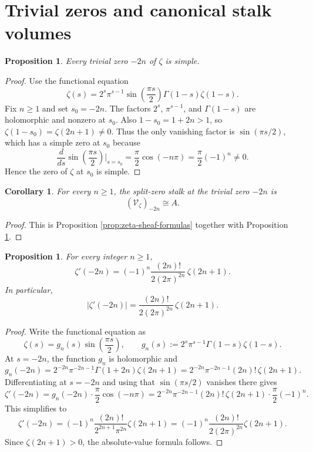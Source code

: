 \documentclass[11pt,a4paper]{article}
\newtheorem{proposition}[theorem]{Proposition}
\newtheorem{corollary}[theorem]{Corollary}
\theoremstyle{definition}
\theoremstyle{remark}
\newcommand{\Vzet}{\mathcal V_{\zeta}}
\begin{document}
\section{Trivial zeros and canonical stalk volumes}

\begin{proposition}\label{prop:trivial-simple}
Every trivial zero $-2n$ of $\zeta$ is simple.
\end{proposition}

\begin{proof}
Use the functional equation
\[
\zeta(s)=2^s\pi^{s-1}\sin\!\left(\frac{\pi s}{2}\right)\Gamma(1-s)\zeta(1-s).
\]
Fix $n\ge1$ and set $s_0=-2n$.  The factors $2^s$, $\pi^{s-1}$, and $\Gamma(1-s)$ are holomorphic and nonzero at $s_0$.  Also $1-s_0=1+2n>1$, so $\zeta(1-s_0)=\zeta(2n+1)\neq0$.  Thus the only vanishing factor is $\sin(\pi s/2)$, which has a simple zero at $s_0$ because
\[
\frac{d}{ds}\sin\!\left(\frac{\pi s}{2}\right)\Big|_{s=s_0}
=\frac\pi2\cos(-n\pi)=\frac\pi2(-1)^n\neq0.
\]
Hence the zero of $\zeta$ at $s_0$ is simple.
\end{proof}

\begin{corollary}\label{cor:trivial-stalk-A}
For every $n\ge1$, the split-zero stalk at the trivial zero $-2n$ is
\[
(\Vzet)_{-2n}\cong A.
\]
\end{corollary}

\begin{proof}
This is Proposition \ref{prop:zeta-sheaf-formulas} together with Proposition \ref{prop:trivial-simple}.
\end{proof}

\begin{proposition}\label{prop:trivial-derivative-formula}
For every integer $n\ge1$,
\[
\zeta'(-2n)=(-1)^n\frac{(2n)!}{2(2\pi)^{2n}}\,\zeta(2n+1).
\]
In particular,
\[
|\zeta'(-2n)|=\frac{(2n)!}{2(2\pi)^{2n}}\,\zeta(2n+1).
\]
\end{proposition}

\begin{proof}
Write the functional equation as
\[
\zeta(s)=g_n(s)\sin\!\left(\frac{\pi s}{2}\right),
\qquad
g_n(s):=2^s\pi^{s-1}\Gamma(1-s)\zeta(1-s).
\]
At $s=-2n$, the function $g_n$ is holomorphic and
\[
g_n(-2n)=2^{-2n}\pi^{-2n-1}\Gamma(1+2n)\zeta(2n+1)
=2^{-2n}\pi^{-2n-1}(2n)!\,\zeta(2n+1).
\]
Differentiating at $s=-2n$ and using that $\sin(\pi s/2)$ vanishes there gives
\[
\zeta'(-2n)=g_n(-2n)\cdot \frac\pi2\cos(-n\pi)
=2^{-2n}\pi^{-2n-1}(2n)!\,\zeta(2n+1)\cdot \frac\pi2(-1)^n.
\]
This simplifies to
\[
\zeta'(-2n)=(-1)^n\frac{(2n)!}{2^{2n+1}\pi^{2n}}\zeta(2n+1)
=(-1)^n\frac{(2n)!}{2(2\pi)^{2n}}\zeta(2n+1).
\]
Since $\zeta(2n+1)>0$, the absolute-value formula follows.
\end{proof}
\end{document}
